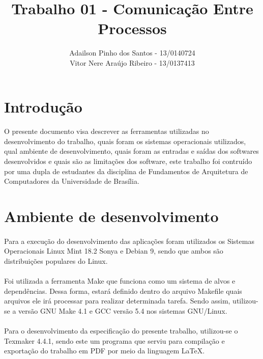 \documentclass[a4paper, 12pt]{article}
\begin{document}
\title{Trabalho 01 - Comunica\c{c}\~ao Entre Processos}
\author{Adailson Pinho dos Santos - 13/0140724\\
Vitor Nere Ara\'ujo Ribeiro - 13/0137413}
\date{}
\maketitle

\newpage

\tableofcontents

\newpage

\section{Introdu\c{c}\~ao}
	\paragraph{}	O presente documento visa descrever as ferramentas utilizadas no desenvolvimento do trabalho, quais foram os sistemas operacionais utilizados, qual ambiente de desenvolvimento, quais foram as entradas e sa\'idas dos softwares desenvolvidos e quais s\~ao as limita\c{c}\~oes dos software, este trabalho foi contru\'ido por uma dupla de estudantes da disciplina de Fundamentos de Arquitetura de Computadores da Universidade de Bras\'ilia. 
\section{Ambiente de desenvolvimento}
    \paragraph{}	Para a execu\c{c}\~ao do desenvolvimento das aplica\c{c}\~oes foram utilizados os Sistemas Operacionais Linux Mint 18.2 Sonya e Debian 9, sendo que ambos s\~ao distribui\c{c}\~oes populares do Linux. 
    \paragraph{}	Foi utilizada a ferramenta Make que funciona como um sistema de alvos e depend\^encias. Dessa forma, estar\'a definido dentro do arquivo Makefile quais arquivos ele ir\'a processar para realizar determinada tarefa. Sendo assim, utilizou-se a vers\~ao GNU Make 4.1 e GCC vers\~ao 5.4 nos sistemas GNU/Linux.
    \paragraph{}	Para o desenvolvimento da especifica\c{c}\~ao do presente trabalho, utilizou-se o Texmaker 4.4.1, sendo este um programa que serviu para compila\c{c}\~ao e exporta\c{c}\~ao do trabalho em PDF por meio da linguagem LaTeX.
\end{document}
